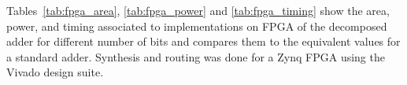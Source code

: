 \documentclass[a4paper]{article}
\begin{document}
Tables~\ref{tab:fpga_area}, \ref{tab:fpga_power} and \ref{tab:fpga_timing} show the area, power, and timing  associated to implementations on FPGA of the decomposed adder for different number of bits and compares them to the equivalent values for a standard adder. 
Synthesis and routing was done for a Zynq FPGA using the Vivado design suite.

\end{document}
